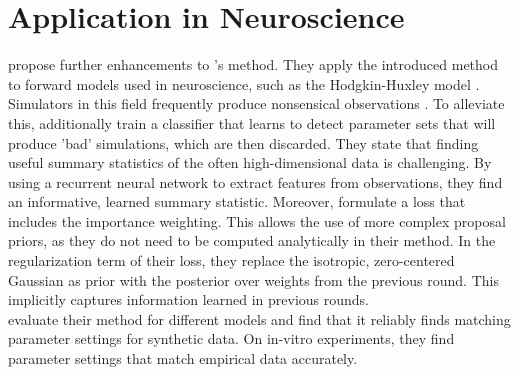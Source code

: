 \documentclass[12pt]{article}
\begin{document}
%


\section*{Application in Neuroscience}
\citet{lueckmann2017flexible} propose further enhancements to \citet{papamakarios2016fast}'s method. They apply the introduced method to forward models used in neuroscience, such as the Hodgkin-Huxley model \cite{hodgkin1952quantitative}. Simulators in this field frequently produce nonsensical observations \citep{lueckmann2017flexible}. To alleviate this, \citet{lueckmann2017flexible} additionally train a classifier that learns to detect parameter sets that will produce 'bad' simulations, which are then discarded. They state that finding useful summary statistics of the often high-dimensional data is challenging. By using a  recurrent neural network to extract features from observations, they find an informative, learned summary statistic. Moreover, \citet{lueckmann2017flexible} formulate a loss that includes the importance weighting. This allows the use of more complex proposal priors, as they do not need to be computed analytically in their method. In the regularization term of their loss, they replace the isotropic, zero-centered Gaussian as prior with the posterior over weights from the previous round. This implicitly captures information learned in previous rounds.\\
\citet{lueckmann2017flexible} evaluate their method for different models and find that it reliably finds matching parameter settings for synthetic data. On in-vitro experiments, they find parameter settings that match empirical data accurately.
\end{document}
